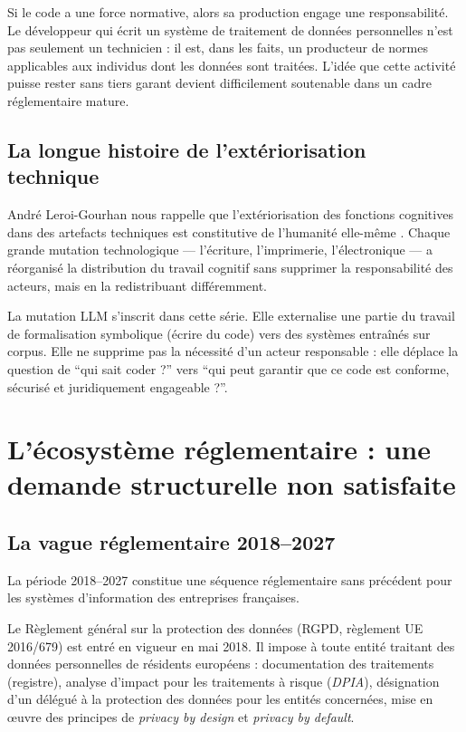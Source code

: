 \documentclass[12pt,a4paper]{article}
\begin{document}
Si le code a une force normative, alors sa production engage une responsabilité. Le développeur qui écrit un système de traitement de données personnelles n'est pas seulement un technicien : il est, dans les faits, un producteur de normes applicables aux individus dont les données sont traitées. L'idée que cette activité puisse rester sans tiers garant devient difficilement soutenable dans un cadre réglementaire mature.

\subsection{La longue histoire de l'extériorisation technique}

André Leroi-Gourhan nous rappelle que l'extériorisation des fonctions cognitives dans des artefacts techniques est constitutive de l'humanité elle-même \parencite{leroigourhan1964}. Chaque grande mutation technologique --- l'écriture, l'imprimerie, l'électronique --- a réorganisé la distribution du travail cognitif sans supprimer la responsabilité des acteurs, mais en la redistribuant différemment.

La mutation LLM s'inscrit dans cette série. Elle externalise une partie du travail de formalisation symbolique (écrire du code) vers des systèmes entraînés sur corpus. Elle ne supprime pas la nécessité d'un acteur responsable : elle déplace la question de \enquote{qui sait coder ?} vers \enquote{qui peut garantir que ce code est conforme, sécurisé et juridiquement engageable ?}.

\section{L'écosystème réglementaire : une demande structurelle non satisfaite}

\subsection{La vague réglementaire 2018--2027}

La période 2018--2027 constitue une séquence réglementaire sans précédent pour les systèmes d'information des entreprises françaises.

Le Règlement général sur la protection des données (RGPD, règlement UE 2016/679) est entré en vigueur en mai 2018. Il impose à toute entité traitant des données personnelles de résidents européens : documentation des traitements (registre), analyse d'impact pour les traitements à risque (\emph{DPIA}), désignation d'un délégué à la protection des données pour les entités concernées, mise en \oe{}uvre des principes de \emph{privacy by design} et \emph{privacy by default}.
\end{document}
